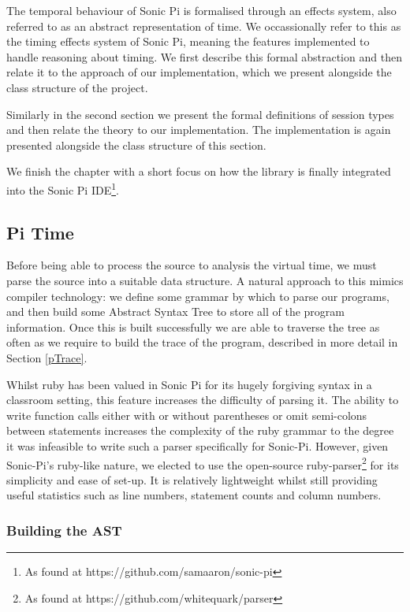 \documentclass[11pt, abstracton, twoside, titlepage=true]{scrartcl}
\begin{document}
The temporal behaviour of Sonic Pi is formalised through an effects system, also 
referred to as an abstract representation of time. We occassionally refer to this 
as the timing effects system of Sonic Pi, meaning the features implemented to 
handle reasoning about timing. We first describe this formal abstraction and then 
relate it to the approach of our implementation, which we present alongside the 
class structure of the project. 

Similarly in the second section we present the formal definitions of session types 
and then relate the theory to our implementation. The implementation is again 
presented alongside the class structure of this section.

We finish the chapter with a short focus on how the library is finally integrated
into the Sonic Pi IDE\footnote{As found at https://github.com/samaaron/sonic-pi}.

\subsection{Pi Time}
Before being able to process the source to analysis the virtual time, we must parse 
the source into a suitable data structure. A 
natural approach to this mimics compiler technology: we define some
grammar by which to parse our programs, and then build some Abstract Syntax Tree 
to store all of the program information. Once this 
is built successfully we are able to traverse the tree as often as we require 
to build the trace of the program, described in more detail in Section \ref{pTrace}.

Whilst ruby has been valued in Sonic Pi for its hugely forgiving
syntax in a classroom setting, this feature increases the difficulty of parsing 
it. The ability to write function calls either with or without parentheses 
or omit semi-colons between statements increases the complexity of the ruby 
grammar to the degree it was infeasible to write such a parser specifically 
for Sonic-Pi. However, given Sonic-Pi's ruby-like nature, we elected to use 
the open-source ruby-parser\footnote{As found at https://github.com/whitequark/parser}
for its simplicity and ease of set-up. It is relatively lightweight whilst 
still providing useful statistics such as line numbers, statement counts and
column numbers. 
\newpage

\subsubsection{Building the AST} \label{build}
\end{document}

